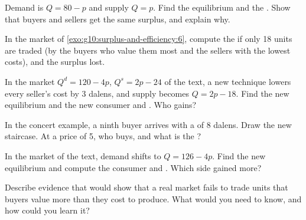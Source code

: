 \begin{exercise}[$\star\star$]\label{exo:g10:surplus-and-efficiency:7}
Demand is $Q = 80 - p$ and supply $Q = p$. Find the equilibrium and the . Show that buyers and sellers get the same surplus,
and explain why.
\end{exercise}

\begin{exercise}[$\star\star$]\label{exo:g10:surplus-and-efficiency:8}
In the market of \cref{exo:g10:surplus-and-efficiency:6}, compute the  if only 18 units are traded (by the buyers who value them most and the
sellers with the lowest costs), and the surplus lost.
\end{exercise}

\begin{exercise}[$\star\star$]\label{exo:g10:surplus-and-efficiency:9}
In the market $Q^d = 120 - 4p$, $Q^s = 2p - 24$ of the text, a new technique lowers every seller's cost by 3 dalens, and supply becomes $Q = 2p - 18$.
Find the new equilibrium and the new consumer and . Who gains?
\end{exercise}

\begin{exercise}[$\star\star$]\label{exo:g10:surplus-and-efficiency:10}
In the concert example, a ninth buyer arrives with a  of 8 dalens. Draw the new staircase. At a price of 5, who buys, and what is the
?
\end{exercise}

\begin{exercise}[$\star\star$]\label{exo:g10:surplus-and-efficiency:11}
In the market of the text, demand shifts to $Q = 126 - 4p$. Find the new equilibrium and compute the consumer and . Which side gained
more?
\end{exercise}

\begin{exercise}[$\star\star\star$]\label{exo:g10:surplus-and-efficiency:12}
Describe evidence that would show that a real market fails to trade units that buyers value more than they cost to produce. What would you need to know,
and how could you learn it?
\end{exercise}

